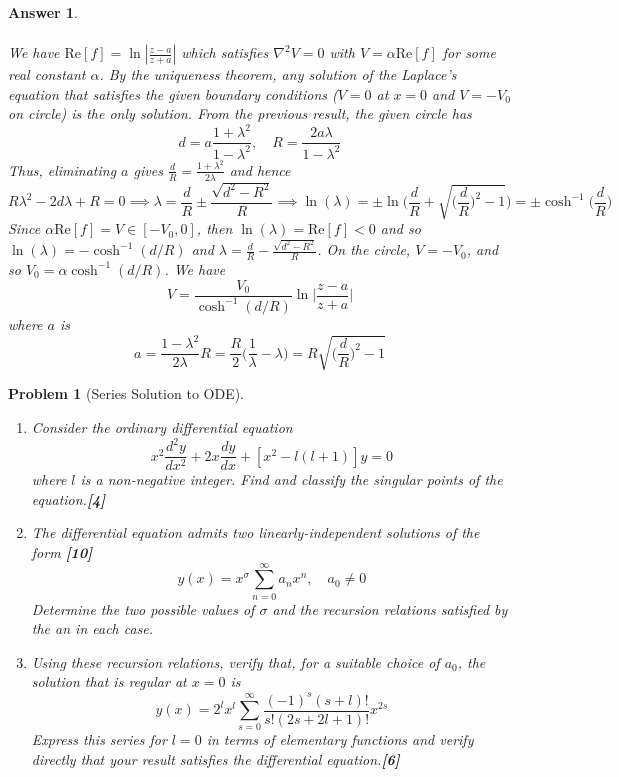 \documentclass[a4paper]{article}
\newtheorem{ans}{Answer}[section]
\theoremstyle{new}
\newtheorem{qns}{Problem}[section]
\begin{document}
\begin{ans}
\begin{enumerate}[label=(\roman*)]
\begin{align}
\end{align}
We have $\text{Re}[f]=\ln|\frac{z-a}{z+a}|$ which satisfies $\nabla^2V=0$ with $V=\alpha\text{Re}[f]$ for some real constant $\alpha$. By the uniqueness theorem, any solution of the Laplace's equation that satisfies the given boundary conditions ($V=0$ at $x=0$ and $V=-V_0$ on circle) is the only solution. From the previous result, the given circle has $$d=a\frac{1+\lambda^2}{1-\lambda^2},\quad R=\frac{2a\lambda}{1-\lambda^2}$$
Thus, eliminating $a$ gives $\frac{d}{R}=\frac{1+\lambda^2}{2\lambda}$ and hence
$$R\lambda^2-2d\lambda+R=0\implies\lambda=\frac{d}{R}\pm\frac{\sqrt{d^2-R^2}}{R}\implies\ln(\lambda)=\pm\ln\bigg(\frac{d}{R}+\sqrt{\bigg(\frac{d}{R}\bigg)^2-1}\bigg)=\pm\cosh^{-1}\bigg(\frac{d}{R}\bigg)$$
Since $\alpha\text{Re}[f]=V\in[-V_0,0]$, then $\ln(\lambda)=\text{Re}[f]<0$ and so $\ln(\lambda)=-\cosh^{-1}(d/R)$ and $\lambda=\frac{d}{R}-\frac{\sqrt{d^2-R^2}}{R}$. On the circle, $V=-V_0$, and so $V_0=\alpha\cosh^{-1}(d/R)$. We have
$$V=\frac{V_0}{\cosh^{-1}(d/R)}\ln\bigg|\frac{z-a}{z+a}\bigg|$$
where $a$ is
$$a=\frac{1-\lambda^2}{2\lambda}R=\frac{R}{2}\bigg(\frac{1}{\lambda}-\lambda\bigg)=R\sqrt{\bigg(\frac{d}{R}\bigg)^2-1}$$
\end{enumerate}
\end{ans}
\newpage
\begin{qns}[Series Solution to ODE]\leavevmode
\begin{enumerate}[label=(\roman*)]
\item Consider the ordinary differential equation
$$x^2\frac{d^2y}{dx^2}+2x\frac{dy}{dx}+[x^2-l(l+1)]y=0$$
where $l$ is a non-negative integer. Find and classify the singular points of the equation.\hfill\textbf{[4]}
\item The differential equation admits two linearly-independent solutions of the form \hfill \textbf{[10]}
$$y(x)=x^\sigma\sum_{n=0}^\infty a_nx^n,\quad a_0\neq 0$$
Determine the two possible values of $\sigma$ and the recursion relations satisfied by the an in each case.
\item Using these recursion relations, verify that, for a suitable choice of $a_0$, the solution that is regular at $x = 0$ is
$$y(x)=2^lx^l\sum_{s=0}^\infty\frac{(-1)^s(s+l)!}{s!(2s+2l+1)!}x^{2s}$$
Express this series for $l = 0$ in terms of elementary functions and verify directly that your result satisfies the differential equation.\hfill \textbf{[6]}
\end{enumerate}
\end{qns}
\end{document}
